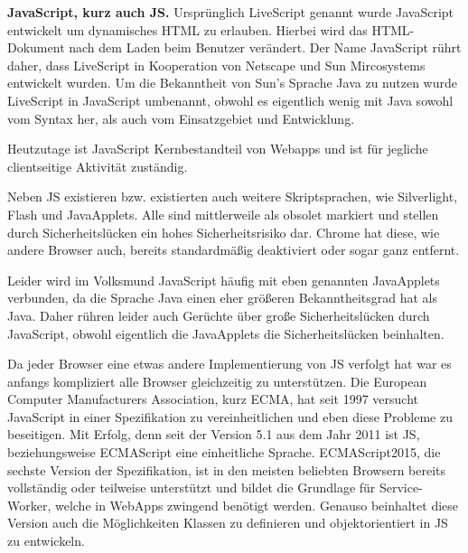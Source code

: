 \documentclass[a4paper,12pt,ngerman,listof=numbered]{scrartcl}      %
\let\oldcite\cite
\renewcommand{\cite}[1]{\textsuperscript{\oldcite{#1}}}
\newcommand{\spacer}{\par\bigskip\noindent}
\begin{document}
	\spacer\textbf{JavaScript, kurz auch JS.} Ursprünglich LiveScript genannt wurde JavaScript entwickelt um dynamisches HTML zu erlauben. Hierbei wird das HTML-Dokument nach dem Laden beim Benutzer verändert. Der Name JavaScript rührt daher, dass LiveScript in Kooperation von Netscape und Sun Mircosystems entwickelt wurden. Um die Bekanntheit von Sun's Sprache Java zu nutzen wurde LiveScript in JavaScript umbenannt, obwohl es eigentlich wenig mit Java sowohl vom Syntax her, als auch vom Einsatzgebiet und Entwicklung. \cite{jsWiki}\par
	Heutzutage ist JavaScript Kernbestandteil von Webapps und ist für jegliche clientseitige Aktivität zuständig.\par
	Neben JS existieren bzw. existierten auch weitere Skriptsprachen, wie Silverlight, Flash und JavaApplets. Alle sind mittlerweile als obsolet markiert und stellen durch Sicherheitslücken ein hohes Sicherheitsrisiko dar.\cite{flashPlayer} Chrome hat diese, wie andere Browser auch, bereits standardmäßig deaktiviert oder sogar ganz entfernt.\cite{chromeNoFlash}\par
	Leider wird im Volksmund JavaScript häufig mit eben genannten JavaApplets verbunden, da die Sprache Java einen eher größeren Bekanntheitsgrad hat als Java. Daher rühren leider auch Gerüchte über große Sicherheitslücken durch JavaScript, obwohl eigentlich die JavaApplets die Sicherheitslücken beinhalten.\par
	Da jeder Browser eine etwas andere Implementierung von JS verfolgt hat war es anfangs kompliziert alle Browser gleichzeitig zu unterstützen. Die European Computer Manufacturers Association, kurz ECMA, hat seit 1997 versucht JavaScript in einer Spezifikation zu vereinheitlichen und eben diese Probleme zu beseitigen. Mit Erfolg, denn seit der Version 5.1 aus dem Jahr 2011 ist JS, beziehungsweise ECMAScript eine einheitliche Sprache. ECMAScript2015, die sechste Version der Spezifikation, ist in den meisten beliebten Browsern bereits vollständig oder teilweise unterstützt und bildet die Grundlage für Service-Worker, welche in WebApps zwingend benötigt werden. Genauso beinhaltet diese Version auch die Möglichkeiten Klassen zu definieren und objektorientiert in JS zu entwickeln.\cite{wikiECMA} \par
	
\end{document}

